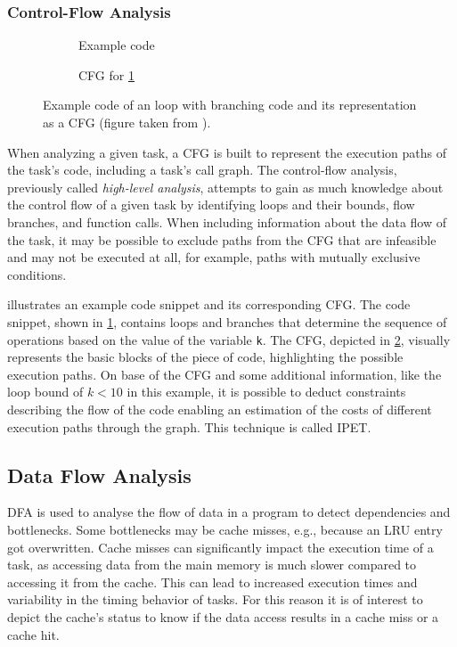 \subsubsection{Control-Flow Analysis}\label{sec:cfa}

\begin{figure}[h]
	\begin{subfigure}[c]{0.45\textwidth}
		
		\caption{Example code}
		\label{fig:cfg_code}
	\end{subfigure}
	\hfill
	\begin{subfigure}[c]{0.45\textwidth}
		
		\caption{\ac{CFG} for \cref{fig:cfg_code}}
		\label{fig:cfg}
	\end{subfigure}
	\caption{Example code of an loop with branching code and its representation as a \ac{CFG} (figure taken from \cite{liCacheModelingRealtime1996}).}
	\label{fig:code_and_cfg}
\end{figure}

When analyzing a given task, a \ac{CFG} is built to represent the execution paths of the task's code, including a task's call graph. The control-flow analysis, previously called \textit{high-level analysis}, attempts to gain as much knowledge about the control flow of a given task by identifying loops and their bounds, flow branches, and function calls. When including information about the data flow of the task, it may be possible to exclude paths from the \ac{CFG} that are infeasible and may not be executed at all, for example, paths with mutually exclusive conditions. 

 illustrates an example code snippet and its corresponding \ac{CFG}. 
The code snippet, shown in \cref{fig:cfg_code}, contains loops and branches that determine the sequence of operations based on the value of the variable \texttt{k}. 
The \ac{CFG}, depicted in \cref{fig:cfg}, visually represents the basic blocks of the piece of code, highlighting the possible execution paths.
On base of the \ac{CFG} and some additional information, like the loop bound of $k<10$ in this example, it is possible to deduct constraints describing the flow of the code enabling an estimation of the costs of different execution paths through the graph\cite{liCacheModelingRealtime1996,wilhelmWorstcaseExecutiontimeProblem2008}.
This technique is called \ac{IPET}\cite{wilhelmWorstcaseExecutiontimeProblem2008}.

\subsection{Data Flow Analysis}\label{sec:dfa}
\ac{DFA} is used to analyse the flow of data in a program to detect dependencies and bottlenecks.
Some bottlenecks may be cache misses, e.g., because an \ac{LRU} entry got overwritten. 
Cache misses can significantly impact the execution time of a task, as accessing data from the main memory is much slower compared to accessing it from the cache\cite{liCacheModelingRealtime1996}. 
This can lead to increased execution times and variability in the timing behavior of tasks.
For this reason it is of interest to depict the cache's status to know if the data access results in a cache miss or a cache hit.

